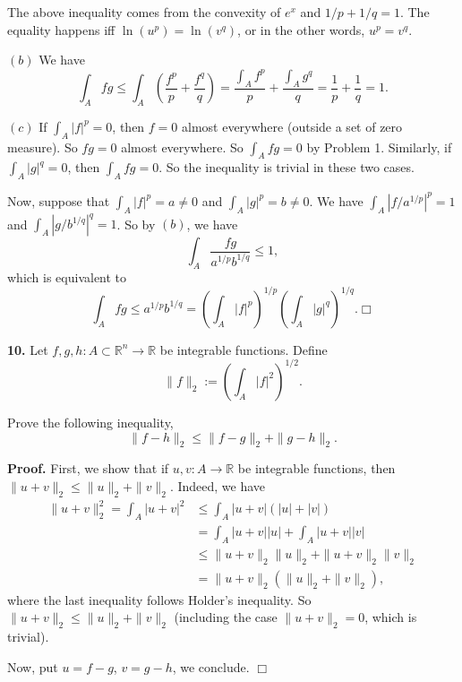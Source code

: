 \documentclass{article}
\begin{document}
The above inequality comes from the convexity of $e^x$ and
$1/p + 1/q = 1$. The equality happens iff $\ln(u^p)  = \ln(v^q)$, or in
the other words, $u^p = v^q$.

$(b)$ We have
\[\int_A fg \le \int_A \left( \frac{f^p}{p}+ \frac{f^q}{q}\right) = \frac{\int_A f^p}{p} + \frac{\int_A g^q}{q} = \frac{1}{p} + \frac{1}{q} =1.\]

$(c)$ If $\int_A |f|^p = 0$, then $f = 0$ almost everywhere (outside a
set of zero measure). So $fg = 0$ almost everywhere. So $\int_A fg = 0$
by Problem 1. Similarly, if $\int_A |g|^q = 0$, then $\int_A fg = 0$. So
the inequality is trivial in these two cases.

Now, suppose that $\int_A |f|^p = a\ne 0$ and $\int_A |g|^p = b \ne 0$.
We have $\int_A |f/a^{1/p}|^p  = 1$ and $\int_A |g/b^{1/q}|^q  = 1$. So
by $(b)$, we have \[\int_A \frac{fg}{a^{1/p}b^{1/q}} \le 1,\] which is
equivalent to
\[\int_A fg \le a^{1/p} b^{1/q} = \left(\int_A |f|^p\right)^{1/p} \left(\int_A |g|^q\right)^{1/q}. \Box\]

    \textbf{10.} Let $f,g,h:A\subset \mathbb{R}^n \to \mathbb{R}$ be
integrable functions. Define
\[\|f\|_2 := \left(\int_A|f|^2\right)^{1/2}.\]

Prove the following inequality,
\[\|f-h\|_2 \le \|f-g\|_2 + \|g- h\|_2.\]

    \textbf{Proof.} First, we show that if $u,v :A \to \mathbb{R}$ be
integrable functions, then $\|u + v\|_2 \le \|u\|_2 + \|v\|_2$. Indeed,
we have \[\begin{aligned}
\|u+v\|_2^2 = \int_A|u+v|^2 &\le \int_A |u+v| (|u|+|v|) \\
&= \int_A|u+v||u| + \int_A |u+v||v| \\
& \le \|u+v\|_2 \|u\|_2 + \|u + v\|_2 \|v\|_2 \\
& =  \|u+v\|_2(\|u\|_2 + \|v\|_2),
\end{aligned}\] where the last inequality follows Holder's inequality.
So $\|u + v\|_2 \le \|u\|_2 + \|v\|_2$ (including the case
$\|u+v\|_2 = 0$, which is trivial).

Now, put $u= f- g$, $v = g-h$, we conclude. $\Box$


    
    
    
    
\end{document}
